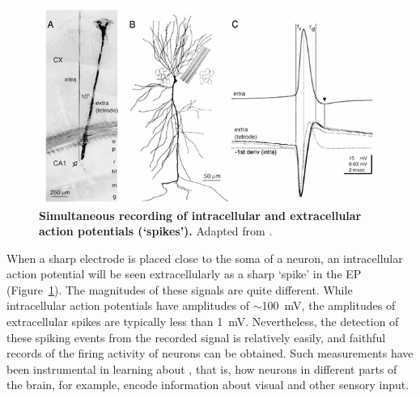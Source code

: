 \begin{figure}[!ht]
\begin{center}
\includegraphics{Figures/Spikes/Spikes-Henze-w100-r150}
\end{center}
\caption{\textbf{Simultaneous recording of intracellular and extracellular action potentials (`spikes').}
Adapted from \citet{Henze2000}.
}
\label{Spikes:fig:Henze}
\end{figure}


When a sharp electrode is placed close to the soma of a neuron, an intracellular action potential will be seen
extracellularly as a sharp `spike' in the EP (Figure~\ref{Spikes:fig:Henze}). The magnitudes of these signals are quite different. While intracellular action potentials have amplitudes of $\sim$100~mV, the amplitudes of extracellular
spikes are typically less than 1~mV. Nevertheless, the detection of these spiking events from the recorded signal is relatively easily, and faithful records of the firing activity of neurons can be obtained. Such measurements have been instrumental in learning about , that is, how neurons in different parts of the brain, for example, encode information about visual and other sensory input. 

